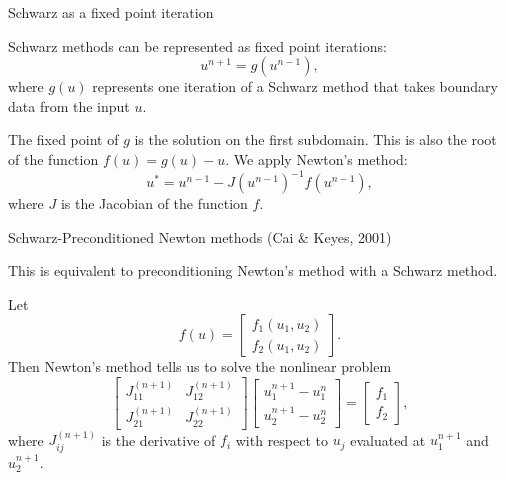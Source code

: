\documentclass{beamer}
\begin{document}
\begin{frame}{Schwarz as a fixed point iteration}

Schwarz methods can be represented as fixed point iterations:
\begin{equation*}
	u^{n+1} = g \left ( u^{n-1} \right ),
\end{equation*}
where $g(u)$ represents one iteration of a Schwarz method that takes boundary data from the input $u$.

The fixed point of $g$ is the solution on the first subdomain.
This is also the root of the function $f(u) = g(u) - u$.
We apply Newton's method:
\begin{equation*}
	u^* = u^{n-1} - J(u^{n-1})^{-1} f(u^{n-1}),
\end{equation*}
where $J$ is the Jacobian of the function $f$.
\end{frame}

\begin{frame}{Schwarz-Preconditioned Newton methods (Cai \& Keyes, 2001)}

This is equivalent to preconditioning Newton's method with a Schwarz method.

Let
\begin{equation*}
	f(u) = \begin{bmatrix} f_1(u_1, u_2) \\ f_2(u_1,u_2) \end{bmatrix}.
\end{equation*}
Then Newton's method tells us to solve the nonlinear problem
\begin{equation*}
	\begin{bmatrix} J_{11}^{(n+1)} & J_{12}^{(n+1)} \\ J_{21}^{(n+1)} & J_{22}^{(n+1)} \end{bmatrix} \begin{bmatrix} u_1^{n+1} - u_1^n \\ u_2^{n+1} - u_2^n \end{bmatrix} = \begin{bmatrix} f_1 \\ f_2 \end{bmatrix},
\end{equation*}
where $J_{ij}^{(n+1)}$ is the derivative of $f_i$ with respect to $u_j$ evaluated at $u_1^{n+1}$ and $u_2^{n+1}$.
\end{frame}
\end{document}
